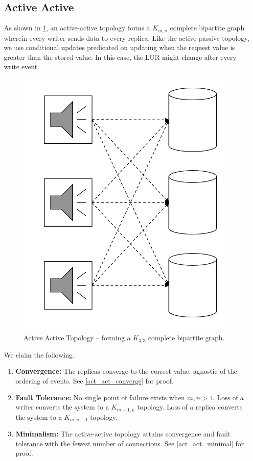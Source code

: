\documentclass[12pt]{article}
\begin{document}
\subsection{Active Active} \label{act_act}

As shown in \cref{act_act_img}, an active-active topology forms a \(K_{m, n}\) complete bipartite graph wherein every writer sends data to every replica. Like the active-passive topology, we use conditional updates predicated on updating when the request value is greater than the stored value. In this case, the LUR might change after every write event.

\begin{figure}[htbp]
	\centering
	\includegraphics[width=.45\textwidth]{act_act.png}
	\caption{Active Active Topology -- forming a \(K_{3, 3}\) complete bipartite graph.}
	\label{act_act_img}
\end{figure}

We claim the following.
\begin{enumerate}
	\item \textbf{Convergence:} The replicas converge to the correct value, agnostic of the ordering of events. See \cref{act_act_converge} for proof.
	
	\item \textbf{Fault Tolerance:} No single point of failure exists when \(m, n > 1\). Loss of a writer converts the system to a \(K_{m - 1, n}\) topology. Loss of a replica converts the system to a \(K_{m, n - 1}\) topology.
	
	\item \textbf{Minimalism:} The active-active topology attains convergence and fault tolerance with the fewest number of connections. See \cref{act_act_minimal} for proof.
\end{enumerate}
\end{document}
